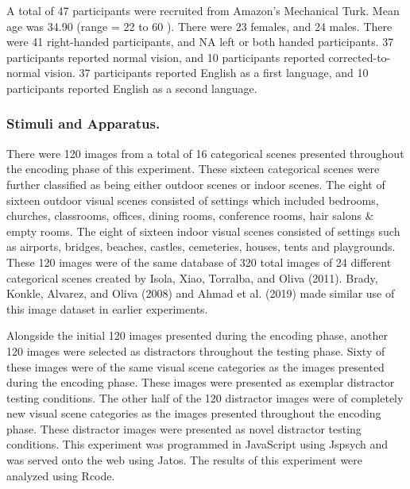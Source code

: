 \documentclass[
  english,
  man,floatsintext]{apa6}
\begin{document}
A total of 47 participants were recruited from Amazon's Mechanical Turk. Mean age was 34.90 (range = 22 to 60 ). There were 23 females, and 24 males. There were 41 right-handed participants, and NA left or both handed participants. 37 participants reported normal vision, and 10 participants reported corrected-to-normal vision. 37 participants reported English as a first language, and 10 participants reported English as a second language.

\hypertarget{stimuli-and-apparatus.}{%
\subsubsection{Stimuli and Apparatus.}\label{stimuli-and-apparatus.}}

There were 120 images from a total of 16 categorical scenes presented throughout the encoding phase of this experiment. These sixteen categorical scenes were further classified as being either outdoor scenes or indoor scenes. The eight of sixteen outdoor visual scenes consisted of settings which included bedrooms, churches, classrooms, offices, dining rooms, conference rooms, hair salons \& empty rooms. The eight of sixteen indoor visual scenes consisted of settings such as airports, bridges, beaches, castles, cemeteries, houses, tents and playgrounds. These 120 images were of the same database of 320 total images of 24 different categorical scenes created by Isola, Xiao, Torralba, and Oliva (2011). Brady, Konkle, Alvarez, and Oliva (2008) and Ahmad et al. (2019) made similar use of this image dataset in earlier experiments.

Alongside the initial 120 images presented during the encoding phase, another 120 images were selected as distractors throughout the testing phase. Sixty of these images were of the same visual scene categories as the images presented during the encoding phase. These images were presented as exemplar distractor testing conditions. The other half of the 120 distractor images were of completely new visual scene categories as the images presented throughout the encoding phase. These distractor images were presented as novel distractor testing conditions. This experiment was programmed in JavaScript using Jspsych and was served onto the web using Jatos. The results of this experiment were analyzed using Rcode.
\end{document}
